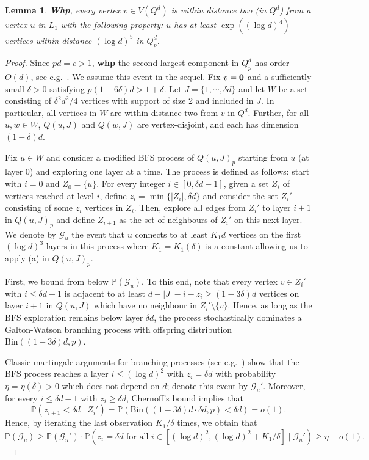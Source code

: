 \documentclass[reqno,final,a4paper]{amsart}
\newtheorem{lemma}[thm]{Lemma}
\theoremstyle{definition}
\newcommand{\cG}{\mathcal{G}}
\newcommand{\1}{\mathbbm{1}}
\begin{document}
\begin{lemma}\label{l: distance two}
\textbf{Whp}, every vertex $v\in V(Q^d)$ is within distance two (in $Q^d$) from a vertex $u$ in $L_1$ with the following property: $u$ has at least $\exp((\log d)^4)$ vertices within distance $(\log d)^5$ in $Q^d_p$. 
\end{lemma}
\begin{proof}
Since $pd=c>1$, \textbf{whp} the second-largest component in $Q^d_p$ has order $O(d)$, see e.g.\ \cite[Theorem~13.1]{FK16}. We assume this event in the sequel.
Fix $v=\bf{0}$ and a sufficiently small $\delta>0$ satisfying $p(1-6\delta)d>1+\delta$.
Let $J=\{1,\cdots,\delta d\}$ and let $W$ be a set consisting of $\delta^2d^2/4$ vertices with support of size 2 and included in $J$. In particular, all vertices in $W$ are within distance two from $v$ in $Q^d$.
Further, for all $u,w\in W$, $Q(u,J)$ and $Q(w,J)$ are vertex-disjoint, and each has dimension $(1-\delta)d$. 

Fix $u\in W$ and consider a modified BFS process of $Q(u,J)_p$ starting from $u$ (at layer 0) and exploring one layer at a time. 
The process is defined as follows: start with $i=0$ and $Z_0=\{u\}$. For every integer $i\in [0,\delta d-1]$, 
given a set $Z_i$ of vertices reached at level $i$, define $z_i = \min\{|Z_i|,\delta d\}$ and consider the set $Z_i'$ consisting of some $z_i$ vertices in $Z_i$.
Then, explore all edges from $Z_i'$ to layer $i+1$ in $Q(u,J)_p$ and define $Z_{i+1}$ as the set of neighbours of $Z_i'$ on this next layer. 
We denote by $\cG_u$ the event that $u$ connects to at least $K_1d$ vertices on the first $(\log d)^3$ layers in this process where $K_1=K_1(\delta)$ is a constant allowing us to apply (a) in $Q(u,J)_p$.

First, we bound from below $\mathbb P(\cG_u)$.
To this end, note that every vertex $v\in Z_i'$ with $i\le \delta d-1$ is adjacent to at least $d-|J|-i-z_i\ge (1-3\delta)d$ vertices on layer $i+1$ in $Q(u,J)$ which have no neighbour in $Z_i'\setminus \{v\}$.
Hence, as long as the BFS exploration remains below layer $\delta d$, the process stochastically dominates a Galton-Watson branching process with offspring distribution $\mathrm{Bin}((1-3\delta) d,p)$.



Classic martingale arguments for branching processes (see e.g.\ \cite[Chapter 4.3.4]{D19}) show that the BFS process reaches a layer $i\le (\log d)^2$ with $z_i = \delta d$ with probability $\eta=\eta(\delta)>0$ which does not depend on $d$; denote this event by $\cG_u'$.
Moreover, for every $i\le \delta d-1$ with $z_i\ge \delta d$, Chernoff's bound implies that
\[\mathbb P(z_{i+1}<\delta d \mid Z_i') = \mathbb P(\mathrm{Bin}((1-3\delta)d\cdot \delta d, p) < \delta d)=o(1).\]
Hence, by iterating the last observation $K_1/\delta$ times, we obtain that
\[\mathbb P(\cG_u)\ge \mathbb P(\cG_u')\cdot\mathbb P(z_i=\delta d\text{ for all }i\in [(\log d)^2, (\log d)^2+K_1/\delta]\mid \cG_u')\ge \eta-o(1).\]


\end{proof}
\end{document}

